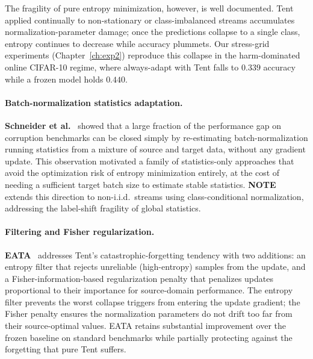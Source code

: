 The fragility of pure entropy minimization, however, is well documented.
Tent applied continually to non-stationary or class-imbalanced streams
accumulates normalization-parameter damage; once the predictions collapse to
a single class, entropy continues to decrease while accuracy plummets.
Our stress-grid experiments (Chapter~\ref{ch:exp2}) reproduce this collapse
in the harm-dominated online CIFAR-10 regime, where always-adapt with Tent
falls to $0.339$ accuracy while a frozen model holds $0.440$.

\paragraph{Batch-normalization statistics adaptation.}
\textbf{Schneider et al.}~\cite{schneider2020bn} showed that a large fraction
of the performance gap on corruption benchmarks can be closed simply by
re-estimating batch-normalization running statistics from a mixture of source
and target data, without any gradient update.
This observation motivated a family of statistics-only approaches that avoid
the optimization risk of entropy minimization entirely, at the cost of needing
a sufficient target batch size to estimate stable statistics.
\textbf{NOTE}~\cite{gong2022note} extends this direction to non-i.i.d.\ streams
using class-conditional normalization, addressing the label-shift fragility of
global statistics.

\paragraph{Filtering and Fisher regularization.}
\textbf{EATA}~\cite{niu2022eata} addresses Tent's catastrophic-forgetting
tendency with two additions: an entropy filter that rejects unreliable
(high-entropy) samples from the update, and a Fisher-information-based
regularization penalty that penalizes updates proportional to their importance
for source-domain performance.
The entropy filter prevents the worst collapse triggers from entering the
update gradient; the Fisher penalty ensures the normalization parameters do
not drift too far from their source-optimal values.
EATA retains substantial improvement over the frozen baseline on standard
benchmarks while partially protecting against the forgetting that pure Tent
suffers.

